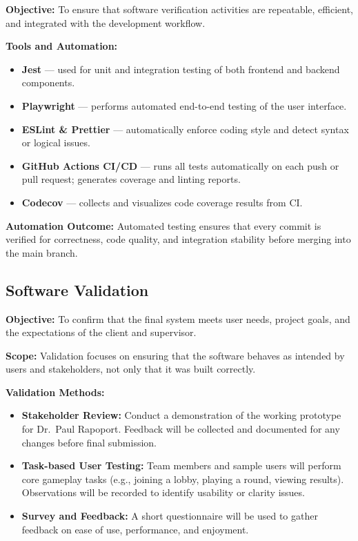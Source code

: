 \documentclass[12pt, titlepage]{article}
\begin{document}
\noindent\textbf{Objective:}  
To ensure that software verification activities are repeatable, efficient, and integrated with the development workflow.

\noindent\textbf{Tools and Automation:}
\begin{itemize}
    \item \textbf{Jest} --- used for unit and integration testing of both frontend and backend components.
    \item \textbf{Playwright} --- performs automated end-to-end testing of the user interface.
    \item \textbf{ESLint \& Prettier} --- automatically enforce coding style and detect syntax or logical issues.
    \item \textbf{GitHub Actions CI/CD} --- runs all tests automatically on each push or pull request; generates coverage and linting reports.
    \item \textbf{Codecov} --- collects and visualizes code coverage results from CI.
\end{itemize}

\noindent\textbf{Automation Outcome:}  
Automated testing ensures that every commit is verified for correctness, code quality, and integration stability before merging into the main branch.

\subsection{Software Validation}

\noindent\textbf{Objective:}  
To confirm that the final system meets user needs, project goals, and the expectations of the client and supervisor.

\noindent\textbf{Scope:}  
Validation focuses on ensuring that the software behaves as intended by users and stakeholders, not only that it was built correctly.

\noindent\textbf{Validation Methods:}
\begin{itemize}
    \item \textbf{Stakeholder Review:}  
    Conduct a demonstration of the working prototype for Dr.\ Paul Rapoport.  
    Feedback will be collected and documented for any changes before final submission.
    
    \item \textbf{Task-based User Testing:}  
    Team members and sample users will perform core gameplay tasks (e.g., joining a lobby, playing a round, viewing results).  
    Observations will be recorded to identify usability or clarity issues.

    \item \textbf{Survey and Feedback:}  
    A short questionnaire will be used to gather feedback on ease of use, performance, and enjoyment.
\end{itemize}
\end{document}
